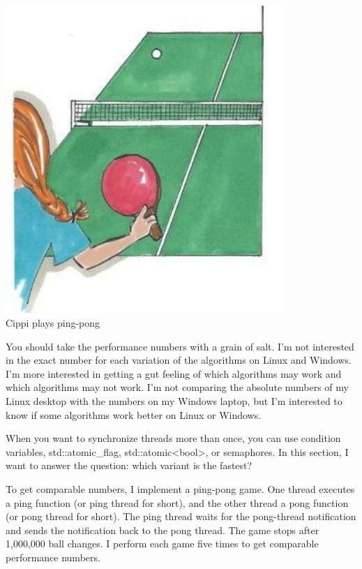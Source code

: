 
\begin{center}
\includegraphics[width=0.8\textwidth]{content/3/chapter7/images/1.png}\\
Cippi plays ping-pong
\end{center}

\begin{tcolorbox}[colback=blue!5!white,colframe=blue!75!black,title={The Reference PCs}]
You should take the performance numbers with a grain of salt. I’m not interested in the exact number for each variation of the algorithms on Linux and Windows. I’m more interested in getting a gut feeling of which algorithms may work and which algorithms may not work. I’m not comparing the absolute numbers of my Linux desktop with the numbers on my Windows laptop, but I’m interested to know if some algorithms work better on Linux or Windows.
\end{tcolorbox}

When you want to synchronize threads more than once, you can use condition variables, std::atomic\_flag, std::atomic<bool>, or semaphores. In this section, I want to answer the question: which variant is the fastest?

To get comparable numbers, I implement a ping-pong game. One thread executes a ping function (or ping thread for short), and the other thread a pong function (or pong thread for short). The ping thread waits for the pong-thread notification and sends the notification back to the pong thread. The game stops after 1,000,000 ball changes. I perform each game five times to get comparable performance numbers.

